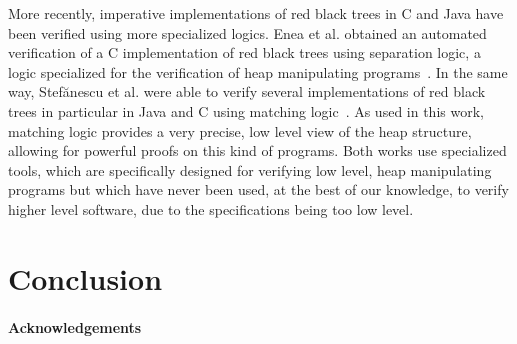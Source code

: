 \documentclass[11pt,a4paper]{article}
\begin{document}
More recently, imperative implementations of red black trees in C and Java have been verified using more specialized logics.
Enea et al. obtained an automated verification of a C implementation of red black trees using separation logic, a logic
specialized for the verification of heap manipulating programs~\cite{enea2015automated}. In the
same way, Stef{\u{a}}nescu et al. were able to verify several implementations of red black trees in particular in Java and
C using matching logic~\cite{stefuanescu2016semantics}. As used in this work, matching logic provides a very precise, low
level view of the heap structure, allowing for powerful proofs on this kind of programs. Both works use specialized tools,
which are specifically designed for verifying low level, heap manipulating programs but which have never been used, at the best
of our knowledge, to verify higher level software, due to the specifications being too low level.

\section{Conclusion}


\paragraph*{Acknowledgements}




\end{document}
